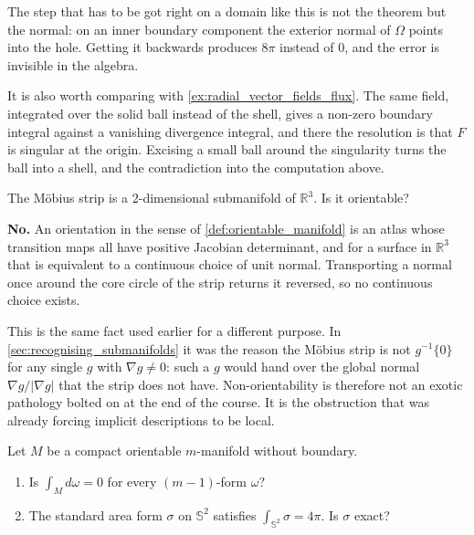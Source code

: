 \begin{ainote}
The step that has to be got right on a domain like this is not the theorem but the normal: on an
inner boundary component the exterior normal of $\Omega$ points into the hole. Getting it
backwards produces $8\pi$ instead of $0$, and the error is invisible in the algebra.

It is also worth comparing with \cref{ex:radial_vector_fields_flux}. The same field, integrated over the solid ball
instead of the shell, gives a non-zero boundary integral against a vanishing divergence integral,
and there the resolution is that $F$ is singular at the origin. Excising a small ball around the
singularity turns the ball into a shell, and the contradiction into the computation above.
\end{ainote}

\begin{question}
\label{q:quiz_q13}
The Möbius strip is a $2$-dimensional submanifold of $\mathbb{R}^3$. Is it orientable?
\end{question}

\begin{answer}
\textbf{No.} An orientation in the sense of \cref{def:orientable_manifold} is an atlas whose
transition maps all have positive Jacobian determinant, and for a surface in $\mathbb{R}^3$ that
is equivalent to a continuous choice of unit normal. Transporting a normal once around the core
circle of the strip returns it reversed, so no continuous choice exists.
\end{answer}

\begin{ainote}
This is the same fact used earlier for a different purpose. In \cref{sec:recognising_submanifolds}
it was the reason the Möbius strip is not $g^{-1}\{0\}$ for any single $g$ with
$\nabla g \neq 0$: such a $g$ would hand over the global normal
$\nabla g/\lvert\nabla g\rvert$ that the strip does not have. Non-orientability is therefore not
an exotic pathology bolted on at the end of the course. It is the obstruction that was already
forcing implicit descriptions to be local.
\end{ainote}

\begin{question}
\label{q:quiz_q14}
Let $M$ be a compact orientable $m$-manifold without boundary.
\begin{enumerate}[label=\textbf{(\alph*)}]
  \item Is $\int_M d\omega = 0$ for every $(m-1)$-form $\omega$?
  \item The standard area form $\sigma$ on $\mathbb{S}^2$ satisfies
    $\int_{\mathbb{S}^2}\sigma = 4\pi$. Is $\sigma$ exact?
\end{enumerate}
\end{question}

